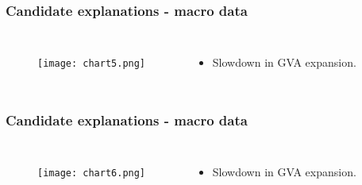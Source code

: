 \documentclass{beamer}
\begin{document}
\begin{frame}
\frametitle{Candidate explanations - macro data}

\begin{columns}


\begin{figure}
\centering
\texttt{[image: chart5.png]}
\end{figure}


\begin{itemize}
\item Slowdown in GVA expansion.


\end{itemize}
\end{columns}
\end{frame}



\begin{frame}
\frametitle{Candidate explanations - macro data}

\begin{columns}


\begin{figure}
\centering
\texttt{[image: chart6.png]}
\end{figure}


\begin{itemize}
\item Slowdown in GVA expansion.


\end{itemize}
\end{columns}
\end{frame}
\end{document}
